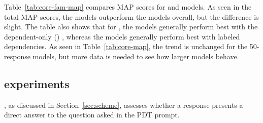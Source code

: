 Table~\ref{tab:core-fam-map} compares  MAP scores for  and  models. As seen in the total MAP scores, the  models outperform the  models overall, but the difference is slight. The table also shows that for , the  models generally perform best with the dependent-only () , whereas the  models generally perform best with labeled dependencies. As seen in Table~\ref{tab:core-map}, the trend is unchanged for the  50-response models, but more data is needed to see how larger  models behave.



\subsection{ experiments}
\label{sec:map-answer}

, as discussed in Section~\ref{sec:scheme}, assesses whether a response presents a direct answer to the question asked in the PDT prompt.


